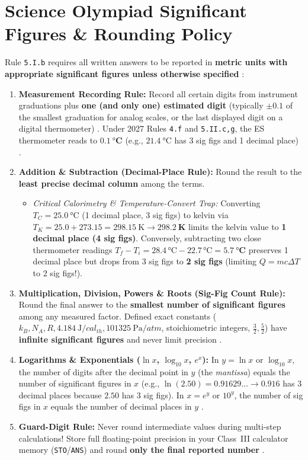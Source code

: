 \section{Science Olympiad Significant Figures \& Rounding Policy}
\label{sec:02.4}

Rule \texttt{5.I.b} requires all written answers to be reported in \textbf{metric units with appropriate significant figures unless otherwise specified} :
\begin{enumerate}
  \item \textbf{Measurement Recording Rule:} Record all certain digits from instrument graduations plus \textbf{one (and only one) estimated digit} (typically $\pm 0.1$ of the smallest graduation for analog scales, or the last displayed digit on a digital thermometer) . Under 2027 Rules \texttt{4.f} and \texttt{5.II.c,g}, the ES thermometer reads to $\mathbf{\SI{0.1}{\celsius}}$ (e.g., $\SI{21.4}{\celsius}$ has 3 sig figs and 1 decimal place) .
  \item \textbf{Addition \& Subtraction (Decimal-Place Rule):} Round the result to the \textbf{least precise decimal column} among the terms.
    \begin{itemize}
      \item \emph{Critical Calorimetry \& Temperature-Convert Trap:} Converting $T_C = \SI{25.0}{\celsius}$ (1 decimal place, 3 sig figs) to kelvin via $T_K = 25.0 + 273.15 = \SI{298.15}{\kelvin} \to \mathbf{\SI{298.2}{\kelvin}}$ limits the kelvin value to \textbf{1 decimal place (4 sig figs)}. Conversely, subtracting two close thermometer readings $T_f - T_i = 28.4\,\si{\celsius} - 22.7\,\si{\celsius} = \mathbf{\SI{5.7}{\celsius}}$ preserves 1 decimal place but drops from 3 sig figs to \textbf{2 sig figs} (limiting $Q = mc\Delta T$ to 2 sig figs!).
    \end{itemize}
  \item \textbf{Multiplication, Division, Powers \& Roots (Sig-Fig Count Rule):} Round the final answer to the \textbf{smallest number of significant figures} among any measured factor. Defined exact constants ($k_B, N_A, R, \SI{4.184}{\joule/cal_{th}}, \SI{101325}{\pascal/atm}$, stoichiometric integers, $\tfrac{3}{2}, \tfrac{5}{2}$) have \textbf{infinite significant figures} and never limit precision .
  \item \textbf{Logarithms \& Exponentials ($\ln x$, $\log_{10} x$, $e^x$):} In $y = \ln x$ or $\log_{10} x$, the number of digits after the decimal point in $y$ (the \emph{mantissa}) equals the number of significant figures in $x$ (e.g., $\ln(\num{2.50}) = 0.91629\ldots \to \mathbf{0.916}$ has 3 decimal places because $\num{2.50}$ has 3 sig figs). In $x = e^y$ or $10^y$, the number of sig figs in $x$ equals the number of decimal places in $y$ .
  \item \textbf{Guard-Digit Rule:} Never round intermediate values during multi-step calculations! Store full floating-point precision in your Class~III calculator memory (\texttt{STO}/\texttt{ANS}) and round \textbf{only the final reported number} .
\end{enumerate}

